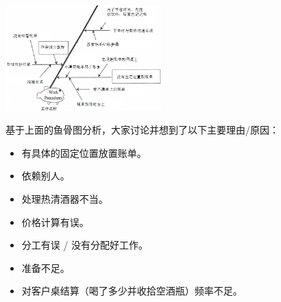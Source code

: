 
\includegraphics[width=6cm]{club1511.jpg}

基于上面的鱼骨图分析，大家讨论并想到了以下主要理由/原因：

\begin{itemize}
\tightlist
\item
  有具体的固定位置放置账单。
\end{itemize}

\begin{itemize}
\tightlist
\item
  依赖别人。
\end{itemize}

\begin{itemize}
\tightlist
\item
  处理热清酒器不当。
\end{itemize}

\begin{itemize}
\tightlist
\item
  价格计算有误。
\end{itemize}

\begin{itemize}
\tightlist
\item
  分工有误 / 没有分配好工作。
\end{itemize}

\begin{itemize}
\tightlist
\item
  准备不足。
\end{itemize}

\begin{itemize}
\tightlist
\item
  对客户桌结算（喝了多少并收拾空酒瓶）频率不足。
\end{itemize}


